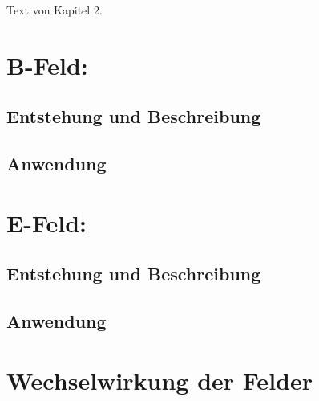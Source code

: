 Text von Kapitel 2.
\section{B-Feld:}
\subsection{Entstehung und Beschreibung}
\subsection{Anwendung}

\section{E-Feld:}
\subsection{Entstehung und Beschreibung}
\subsection{Anwendung}
\section{Wechselwirkung der Felder}%
